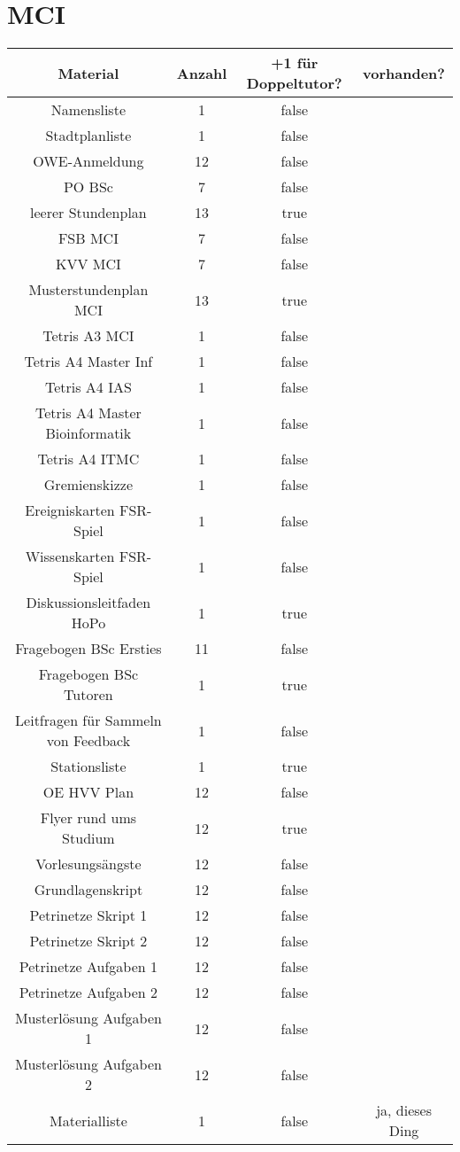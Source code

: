 \documentclass[10pt,a4paper,oneside,ngerman,numbers=noenddot]{scrartcl}
\begin{document}
\section{MCI}

	\begin{tabular}{c|c|c|c}
		\textbf{Material} & \textbf{Anzahl} & \textbf{+1 für Doppeltutor?} & \textbf{vorhanden?} \\
		\hline
		Namensliste & 1 & false & \\
		\hline
		Stadtplanliste & 1 & false & \\
		\hline
		OWE-Anmeldung & 12 & false & \\
		\hline
		PO BSc & 7 & false & \\
		\hline
		leerer Stundenplan & 13 & true & \\
		\hline
		FSB MCI & 7 & false & \\
		\hline
		KVV MCI & 7 & false & \\
		\hline
		Musterstundenplan MCI & 13 & true & \\
		\hline
		Tetris A3 MCI & 1 & false & \\
		\hline
		Tetris A4 Master Inf & 1 & false & \\
		\hline
		Tetris A4 IAS & 1 & false & \\
		\hline
		Tetris A4 Master Bioinformatik & 1 & false & \\
		\hline
		Tetris A4 ITMC & 1 & false & \\
		\hline
		Gremienskizze & 1 & false & \\
		\hline
		Ereigniskarten FSR-Spiel & 1 & false & \\
		\hline
		Wissenskarten FSR-Spiel & 1 & false & \\
		\hline
		Diskussionsleitfaden HoPo & 1 & true & \\
		\hline
		Fragebogen BSc Ersties & 11 & false & \\
		\hline
		Fragebogen BSc Tutoren & 1 & true & \\
		\hline
		Leitfragen für Sammeln von Feedback & 1 & false & \\
		\hline
		Stationsliste & 1 & true & \\
		\hline
		OE HVV Plan & 12 & false & \\
		\hline
		Flyer rund ums Studium & 12 & true & \\
		\hline
		Vorlesungsängste & 12 & false & \\
		\hline
		Grundlagenskript & 12 & false & \\
		\hline
		Petrinetze Skript 1 & 12 & false & \\
		\hline
		Petrinetze Skript 2 & 12 & false & \\
		\hline
		Petrinetze Aufgaben 1 & 12 & false & \\
		\hline
		Petrinetze Aufgaben 2 & 12 & false & \\
		\hline
		Musterlösung Aufgaben 1 & 12 & false & \\
		\hline
		Musterlösung Aufgaben 2 & 12 & false & \\
		\hline
		Materialliste & 1 & false & ja, dieses Ding \\
	\end{tabular}
\end{document}
